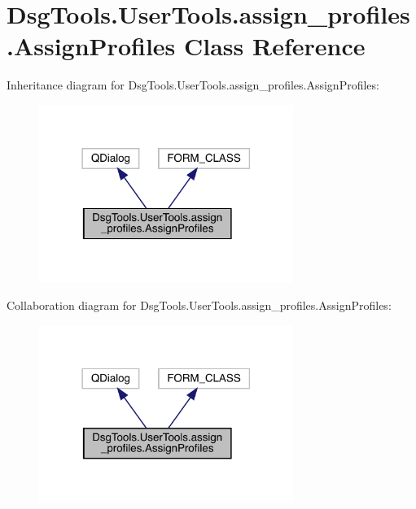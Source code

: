 \hypertarget{class_dsg_tools_1_1_user_tools_1_1assign__profiles_1_1_assign_profiles}{}\section{Dsg\+Tools.\+User\+Tools.\+assign\+\_\+profiles.\+Assign\+Profiles Class Reference}
\label{class_dsg_tools_1_1_user_tools_1_1assign__profiles_1_1_assign_profiles}


Inheritance diagram for Dsg\+Tools.\+User\+Tools.\+assign\+\_\+profiles.\+Assign\+Profiles\+:
\nopagebreak
\begin{figure}[H]
\begin{center}
\leavevmode
\includegraphics[width=234pt]{class_dsg_tools_1_1_user_tools_1_1assign__profiles_1_1_assign_profiles__inherit__graph}
\end{center}
\end{figure}


Collaboration diagram for Dsg\+Tools.\+User\+Tools.\+assign\+\_\+profiles.\+Assign\+Profiles\+:
\nopagebreak
\begin{figure}[H]
\begin{center}
\leavevmode
\includegraphics[width=234pt]{class_dsg_tools_1_1_user_tools_1_1assign__profiles_1_1_assign_profiles__coll__graph}
\end{center}
\end{figure}
